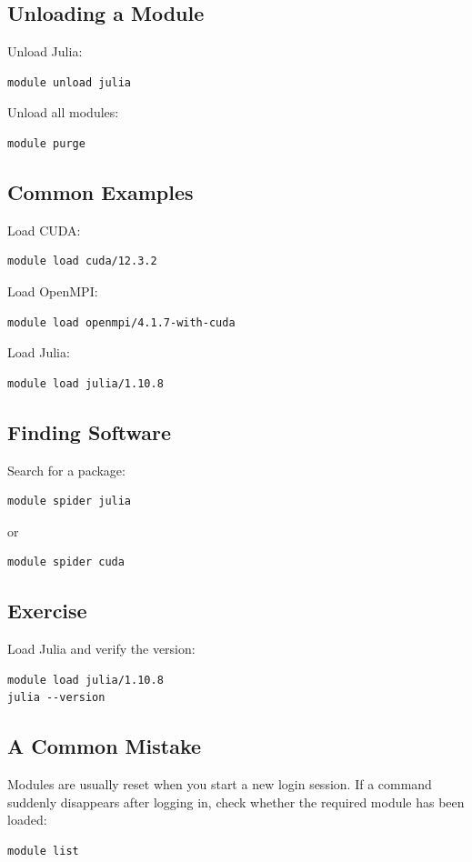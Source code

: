\subsection{Unloading a Module}

Unload Julia:

\begin{lstlisting}
module unload julia
\end{lstlisting}

Unload all modules:

\begin{lstlisting}
module purge
\end{lstlisting}

\subsection{Common Examples}

Load CUDA:

\begin{lstlisting}
module load cuda/12.3.2
\end{lstlisting}

Load OpenMPI:

\begin{lstlisting}
module load openmpi/4.1.7-with-cuda
\end{lstlisting}

Load Julia:

\begin{lstlisting}
module load julia/1.10.8
\end{lstlisting}

\subsection{Finding Software}

Search for a package:

\begin{lstlisting}
module spider julia
\end{lstlisting}

or

\begin{lstlisting}
module spider cuda
\end{lstlisting}

\subsection{Exercise}

Load Julia and verify the version:

\begin{lstlisting}
module load julia/1.10.8
julia --version
\end{lstlisting}

\subsection{A Common Mistake} 

Modules are usually reset when you start a new login session. If a command suddenly disappears after logging in, check whether the required module has been loaded: 

\begin{lstlisting} 
module list 
\end{lstlisting}